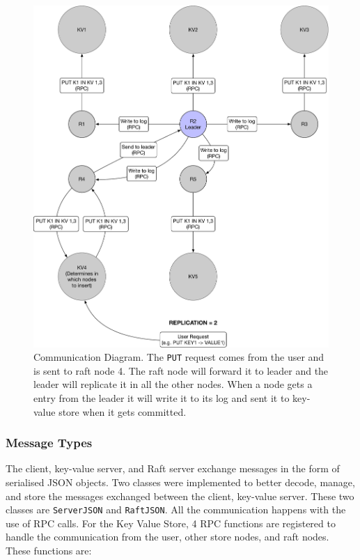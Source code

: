 \documentclass{article}
\begin{document}
\begin{figure}
  \centering
  \includegraphics[width=\textwidth]{communication_diagram.pdf}
  \caption{Communication Diagram. The \texttt{PUT} request comes from the user and is sent to raft node 4. The raft node will forward it to leader and the leader will replicate it in all the other nodes. When a node gets a entry from the leader it will write it to its log and sent it to key-value store when it gets committed.}
  \label{fig:communication}
\end{figure}


\subsubsection{Message Types}
The client, key-value server, and Raft server exchange messages in the form of serialised JSON 
objects. Two classes were implemented to better decode, manage, and store the messages exchanged 
between the client, key-value server. These two classes are \texttt{ServerJSON} 
and \texttt{RaftJSON}. All the communication happens with the use of RPC calls. For the Key Value
Store, 4 RPC functions are registered to handle the communication from the user, other store nodes, 
and raft nodes. These functions are:
\end{document}

